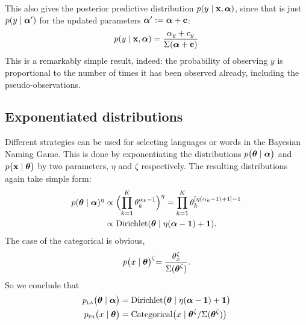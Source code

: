 \documentclass{../src/bcthesispart}
\begin{document}
This also gives the posterior predictive distribution $p(y \mid \boldsymbol{\mathbf{x}}, \boldsymbol{\mathbf{\alpha}})$, since that is just $p(y \mid \boldsymbol{\mathbf{\alpha}}')$ for the updated parameters $\boldsymbol{\mathbf{\alpha}}' := \boldsymbol{\mathbf{\alpha}} + \boldsymbol{\mathbf{c}}$:
\begin{align}
	p(y \mid \boldsymbol{\mathbf{x}}, \boldsymbol{\mathbf{\alpha}}) 
	= \frac{\alpha_y + c_y}{\Sigma(\boldsymbol{\mathbf{\alpha}} + \boldsymbol{\mathbf{c}})}
	\label{eq:app-bng:predictive}
\end{align}
This is a remarkably simple result, indeed: the probability of observing $y$ is proportional to the number of times it has been observed already, including the pseudo-observations.




\subsection{Exponentiated distributions}



Different strategies can be used for selecting languages or words in the Bayesian Naming Game.
This is done by exponentiating the distributions $p\bigl(\boldsymbol{\mathbf{\theta}} \mid \boldsymbol{\mathbf{\alpha}}\bigr)$ and $p\bigl(\boldsymbol{\mathbf{x}} \mid \boldsymbol{\mathbf{\theta}}\bigr)$ by two parameters, $\eta$ and $\zeta$ respectively.
The resulting distributions again take simple form:
\begin{align}
	p(\boldsymbol{\mathbf{\theta}} \mid \boldsymbol{\mathbf{\alpha}})^\eta
		&\propto \Bigl(\prod_{k=1}^K \theta_k^{\alpha_k - 1}\Bigr)^\eta
		= \prod_{k=1}^K \theta_k^{[\eta(\alpha_k - 1) + 1] - 1}
		\\
		&\propto \text{Dirichlet}(\boldsymbol{\mathbf{\theta}} \mid \eta(\boldsymbol{\mathbf{\alpha}}-\boldsymbol{\mathbf{1}})+\boldsymbol{\mathbf{1}}).
\end{align}
The case of the categorical is obvious,
\begin{align}
	p\bigr(x \mid \boldsymbol{\mathbf{\theta}}\bigl)^\zeta 
		= \frac{\theta_x^\zeta}{\Sigma(\boldsymbol{\mathbf{\theta}}^\zeta)}.
\end{align}
So we conclude that
\begin{align}
	\label{eq:app-bng:exponentiated-dirichlet}
	p_{\textsc{la}}\bigl(\boldsymbol{\mathbf{\theta}} \mid \boldsymbol{\mathbf{\alpha}}\bigr)
		&= \text{Dirichlet}\bigl(\boldsymbol{\mathbf{\theta}} \mid \eta(\boldsymbol{\mathbf{\alpha}} -\boldsymbol{\mathbf{1}})+\boldsymbol{\mathbf{1}}\bigr)
	\\
	p_{\textsc{pa}}\bigl(x \mid \boldsymbol{\mathbf{\theta}} \bigr)
		&= \text{Categorical}\bigl(x \mid \boldsymbol{\mathbf{\theta}}^\zeta /\Sigma(\boldsymbol{\mathbf{\theta}}^\zeta)\bigr)
\end{align}
\end{document}
